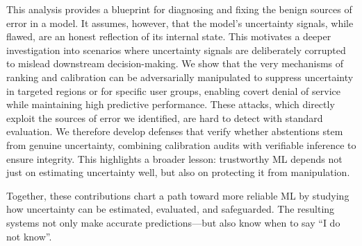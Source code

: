 This analysis provides a blueprint for diagnosing and fixing the benign sources of error in a model. It assumes, however, that the model's uncertainty signals, while flawed, are an honest reflection of its internal state. This motivates a deeper investigation into scenarios where uncertainty signals are deliberately corrupted to mislead downstream decision-making. We show that the very mechanisms of ranking and calibration can be adversarially manipulated to suppress uncertainty in targeted regions or for specific user groups, enabling covert denial of service while maintaining high predictive performance. These attacks, which directly exploit the sources of error we identified, are hard to detect with standard evaluation. We therefore develop defenses that verify whether abstentions stem from genuine uncertainty, combining calibration audits with verifiable inference to ensure integrity. This highlights a broader lesson: trustworthy ML depends not just on estimating uncertainty well, but also on protecting it from manipulation.

Together, these contributions chart a path toward more reliable ML by studying how uncertainty can be estimated, evaluated, and safeguarded. The resulting systems not only make accurate predictions—but also know when to say “I do not know”.


